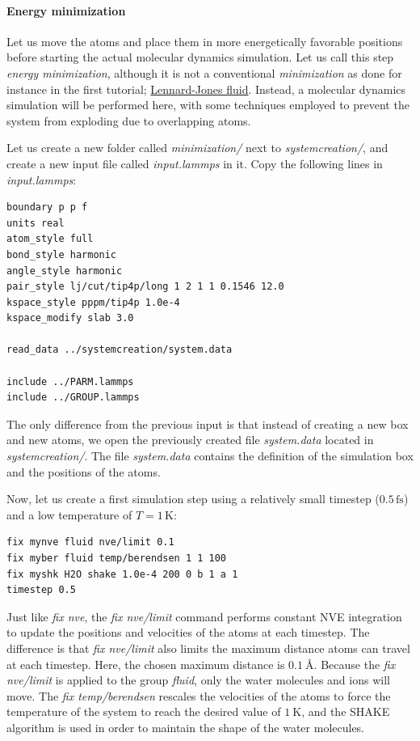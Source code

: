 \documentclass[9pt,tutorial]{livecoms}
\begin{document}
\paragraph{Energy minimization}
Let us move the atoms and place them in more energetically favorable positions before starting the actual molecular dynamics simulation. Let us call this step \textit{energy minimization}, although it is not a conventional \textit{minimization} as done for instance in the first tutorial; \hyperref[lennard-jones-label]{Lennard-Jones fluid}. Instead, a molecular dynamics simulation will be performed here, with some techniques employed to prevent the system from exploding due to overlapping atoms.

Let us create a new folder called \textit{minimization/} next to \textit{systemcreation/}, and create a new input file called \textit{input.lammps} in it. Copy the following lines in \textit{input.lammps}:
{\normalsize \begin{verbatim}
boundary p p f
units real
atom_style full
bond_style harmonic
angle_style harmonic
pair_style lj/cut/tip4p/long 1 2 1 1 0.1546 12.0
kspace_style pppm/tip4p 1.0e-4
kspace_modify slab 3.0

read_data ../systemcreation/system.data

include ../PARM.lammps
include ../GROUP.lammps
\end{verbatim}}
The only difference from the previous input is that instead of creating a new box and new atoms, we open the previously created file \textit{system.data} located in \textit{systemcreation/}. The file \textit{system.data} contains the definition of the simulation box and the positions of the atoms.

Now, let us create a first simulation step using a relatively small
timestep ($0.5\,\text{fs}$) and a low temperature of $T = 1\,\text{K}$:
{\normalsize \begin{verbatim}
fix mynve fluid nve/limit 0.1
fix myber fluid temp/berendsen 1 1 100
fix myshk H2O shake 1.0e-4 200 0 b 1 a 1
timestep 0.5
\end{verbatim}}
Just like \textit{fix nve}, the \textit{fix nve/limit} command performs constant NVE integration to update the positions and velocities of the atoms at each timestep. The difference is that \textit{fix nve/limit} also limits the maximum distance atoms can travel at each timestep. Here, the chosen maximum distance is $0.1~\text{\AA{}}$. Because the \textit{fix nve/limit} is applied to the group \textit{fluid}, only the water molecules and ions will move. The \textit{fix temp/berendsen} rescales the velocities of the atoms to force the temperature of the system to reach the desired value of $1~\text{K}$, and the SHAKE algorithm is used in order to maintain the shape of the water molecules.
\end{document}

